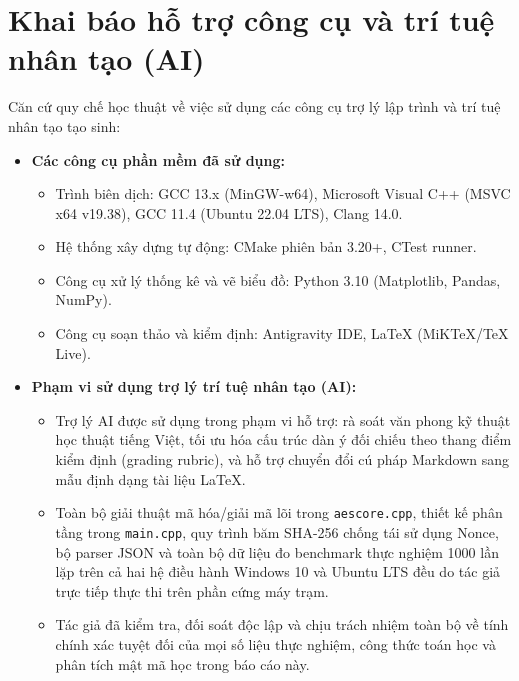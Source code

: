 \documentclass[12pt, a4paper]{report}
\begin{document}
\chapter*{Khai báo hỗ trợ công cụ và trí tuệ nhân tạo (AI)}

Căn cứ quy chế học thuật về việc sử dụng các công cụ trợ lý lập trình và trí tuệ nhân tạo tạo sinh:
\begin{itemize}
    \item \textbf{Các công cụ phần mềm đã sử dụng:}
    \begin{itemize}
        \item Trình biên dịch: GCC 13.x (MinGW-w64), Microsoft Visual C++ (MSVC x64 v19.38), GCC 11.4 (Ubuntu 22.04 LTS), Clang 14.0.
        \item Hệ thống xây dựng tự động: CMake phiên bản 3.20+, CTest runner.
        \item Công cụ xử lý thống kê và vẽ biểu đồ: Python 3.10 (Matplotlib, Pandas, NumPy).
        \item Công cụ soạn thảo và kiểm định: Antigravity IDE, LaTeX (MiKTeX/TeX Live).
    \end{itemize}
    \item \textbf{Phạm vi sử dụng trợ lý trí tuệ nhân tạo (AI):}
    \begin{itemize}
        \item Trợ lý AI được sử dụng trong phạm vi hỗ trợ: rà soát văn phong kỹ thuật học thuật tiếng Việt, tối ưu hóa cấu trúc dàn ý đối chiếu theo thang điểm kiểm định (grading rubric), và hỗ trợ chuyển đổi cú pháp Markdown sang mẫu định dạng tài liệu \LaTeX.
        \item Toàn bộ giải thuật mã hóa/giải mã lõi trong \texttt{aescore.cpp}, thiết kế phân tầng trong \texttt{main.cpp}, quy trình băm SHA-256 chống tái sử dụng Nonce, bộ parser JSON và toàn bộ dữ liệu đo benchmark thực nghiệm 1000 lần lặp trên cả hai hệ điều hành Windows 10 và Ubuntu LTS đều do tác giả trực tiếp thực thi trên phần cứng máy trạm.
        \item Tác giả đã kiểm tra, đối soát độc lập và chịu trách nhiệm toàn bộ về tính chính xác tuyệt đối của mọi số liệu thực nghiệm, công thức toán học và phân tích mật mã học trong báo cáo này.
    \end{itemize}
\end{itemize}
\clearpage

\end{document}
